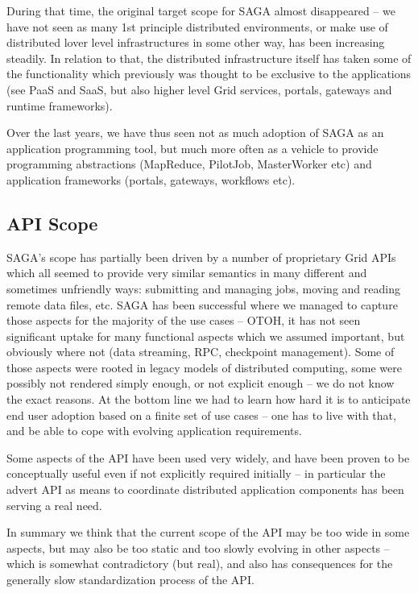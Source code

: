 \documentclass{article}
\begin{document}
  During that time, the original target scope for SAGA almost
  disappeared -- we have not seen as many 1st principle distributed
  environments, or make use of distributed lover level infrastructures
  in some other way, has been increasing steadily.  In relation to
  that, the distributed infrastructure itself has taken some of the
  functionality which previously was thought to be exclusive to the
  applications (see PaaS and SaaS, but also higher level Grid
  services, portals, gateways and runtime frameworks).

  Over the last years, we have thus seen not as much adoption of SAGA
  as an application programming tool, but much more often as a vehicle
  to provide programming abstractions (MapReduce, PilotJob,
  MasterWorker etc) and application frameworks (portals, gateways,
  workflows etc).


 \subsection{API Scope}

  SAGA's scope has partially been driven by a number of proprietary
  Grid APIs which all seemed to provide very similar semantics in many
  different and sometimes unfriendly ways: submitting and managing
  jobs, moving and reading remote data files, etc.  SAGA has been
  successful where we managed to capture those aspects for the
  majority of the use cases -- OTOH, it has not seen significant
  uptake for many functional aspects which we assumed important, but
  obviously where not (data streaming, RPC, checkpoint management).
  Some of those aspects were rooted in legacy models of distributed
  computing, some were possibly not rendered simply enough, or not
  explicit enough -- we do not know the exact reasons.  At the bottom
  line we had to learn how hard it is to anticipate end user adoption
  based on a finite set of use cases -- one has to live with that, and
  be able to cope with evolving application requirements.

  Some aspects of the API have been used very widely, and have been
  proven to be conceptually useful even if not explicitly required
  initially -- in particular the advert API as means to coordinate
  distributed application components has been serving a real need.

  In summary we think that the current scope of the API may be too
  wide in some aspects, but may also be too static and too slowly
  evolving in other aspects -- which is somewhat contradictory (but
  real), and also has consequences for the generally slow
  standardization process of the API.
\end{document}
